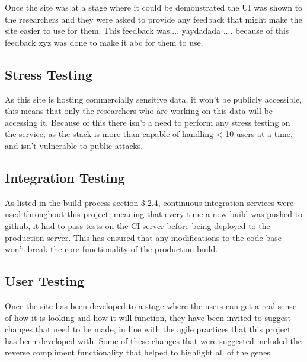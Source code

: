 Once the site was at a stage where it could be demonstrated the UI was shown to the researchers and they were asked to provide any feedback that might make the site easier to use for them. This feedback was.... yaydadada .... because of this feedback xyz was done to make it abc for them to use.

\subsection{Stress Testing}
As this site is hosting commercially sensitive data, it won't be publicly accessible, this means that only the researchers who are working on this data will be accessing it. Because of this there isn't a need to perform any stress testing on the service, as the stack is more than capable of handling < 10 users at a time, and isn't vulnerable to public attacks. 

\subsection{Integration Testing}
As listed in the build process section 3.2.4, continuous integration services were used throughout this project, meaning that every time a new build was pushed to github, it had to pass tests on the CI server before being deployed to the production server. This has ensured that any modifications to the code base won't break the core functionality of the production build. 

\subsection{User Testing}
Once the site has been developed to a stage where the users can get a real sense of how it is looking and how it will function, they have been invited to suggest changes that need to be made, in line with the agile practices that this project has been developed with. Some of these changes that were suggested included the reverse compliment functionality that helped to highlight all of the genes. 
